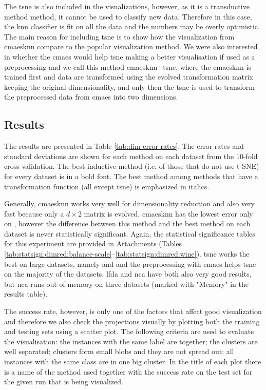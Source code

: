 \documentclass[12pt,a4paper]{report}
\begin{document}
The \ac{tsne} is also included in the visualizations, however, as it is a transductive method method, it cannot be used to classify new data. Therefore in this case, the \ac{knn} classifier is fit on all the data and the numbers may be overly optimistic. The main reason for including \ac{tsne} is to show how the visualization from \ac{cmaesknn} compare to the popular visualization method. We were also interested in whether the \ac{cmaes} would help \ac{tsne} making a better visualisation if used as a preprocessing and we call this method \ac{cmaesknn}+\ac{tsne}, where the \ac{cmaesknn} is trained first and data are transformed using the evolved transformation matrix keeping the original dimensionality, and only then the \ac{tsne} is used to transform the preprocessed data from \ac{cmaes} into two dimensions.

\subsection{Results}

The results are presented in Table \ref{tab:dim-error-rates}. The error rates and standard deviations are shown for each method on each dataset from the 10-fold cross validation. The best inductive method (i.e. of those that do not use t-SNE) for every dataset is in a bold font. The best method among methods that have a transformation function (all except \ac{tsne}) is emphasized in italics.

Generally, \ac{cmaesknn} works very well for dimensionality reduction and also very fast because only a $d\times2$ matrix is evolved. \ac{cmaesknn} has the lowest error only on , however the difference between this method and the best method on each dataset is never statistically significant. Again, the statistical significance tables for this experiment are provided in Attachments (Tables \ref{tab:statsign:dimred:balance-scale}--\ref{tab:statsign:dimred:wine}). \ac{tsne} works the best on large datasets, namely  and  and the preprocessing with \ac{cmaes} helps \ac{tsne} on the majority of the datasets. \ac{lfda} and \ac{nca} have both also very good results, but \ac{nca} runs out of memory on three datasets (marked with "Memory" in the results table).



The success rate, however, is only one of the factors that affect good visualization and therefore we also check the projections visually by plotting both the training and testing sets using a scatter plot. The following criteria are used to evaluate the visualisation: the instances with the same label are together; the clusters are well separated; clusters form small blobs and they are not spread out; all instances with the same class are in one big cluster. In the title of each plot there is a name of the method used together with the success rate on the test set for the given run that is being visualized.
\end{document}
